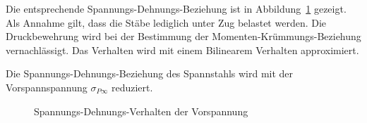 \documentclass[
  11pt,
  letterpaper,
]{scrreprt}
\begin{document}
\begin{figure}[H]


\caption{\label{fig-sigma_eps_t6}}

\end{figure}%

Die entsprechende Spannungs-Dehnungs-Beziehung ist in
Abbildung~\ref{fig-sigma_eps_t6} gezeigt. Als Annahme gilt, dass die
Stäbe lediglich unter Zug belastet werden. Die Druckbewehrung wird bei
der Bestimmung der Momenten-Krümmungs-Beziehung vernachlässigt. Das
Verhalten wird mit einem Bilinearem Verhalten approximiert.

Die Spannungs-Dehnungs-Beziehung des Spannstahls wird mit der
Vorspannspannung \(\sigma_{P\infty}\) reduziert.

\begin{figure}[H]


\caption{\label{fig-sigma_eps_vorspannung_t6}Spannungs-Dehnungs-Verhalten
der Vorspannung}

\end{figure}%
\end{document}
